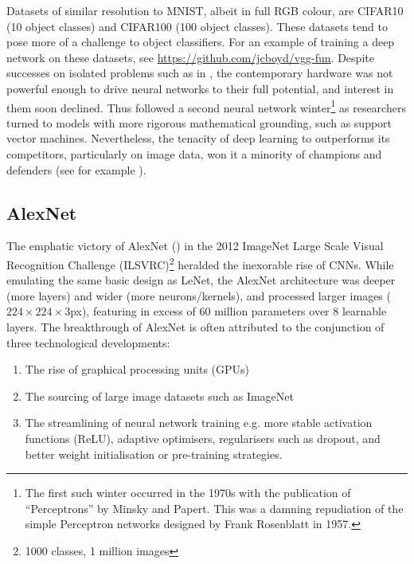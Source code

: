 Datasets of similar resolution to MNIST, albeit in full RGB colour, are CIFAR10 (10 object classes) and CIFAR100 (100 object classes). These datasets tend to pose more of a challenge to object classifiers. For an example of training a deep network on these datasets, see \hyperref[https://github.com/jcboyd/vgg-fun]{https://github.com/jcboyd/vgg-fun}. Despite successes on isolated problems such as in \cite{matan1992reading}, the contemporary hardware was not powerful enough to drive neural networks to their full potential, and interest in them soon declined. Thus followed a second neural network winter\footnote{The first such winter occurred in the 1970s with the publication of ``Perceptrons'' by Minsky and Papert. This was a damning repudiation of the simple Perceptron networks designed by Frank Rosenblatt in 1957.} as researchers turned to models with more rigorous mathematical grounding, such as support vector machines. Nevertheless, the tenacity of deep learning to outperforms its competitors, particularly on image data, won it a minority of champions and defenders (see for example \cite{simard2003best}).

\subsection{AlexNet}

The emphatic victory of AlexNet (\cite{krizhevsky2012imagenet}) in the 2012 ImageNet Large Scale Visual Recognition Challenge (ILSVRC)\footnote{1000 classes, 1 million images} heralded the inexorable rise of CNNs. While emulating the same basic design as LeNet, the AlexNet architecture was deeper (more layers) and wider (more neurons/kernels), and processed larger images ($224\times224\times3$px), featuring in excess of $60$ million parameters over 8 learnable layers. The breakthrough of AlexNet is often attributed to the conjunction of three technological developments:

\begin{enumerate}
\item The rise of graphical processing units (GPUs)
\item The sourcing of large image datasets such as ImageNet
\item The streamlining of neural network training e.g. more stable activation functions (ReLU), adaptive optimisers, regularisers such as dropout, and better weight initialisation or pre-training strategies.
\end{enumerate}

